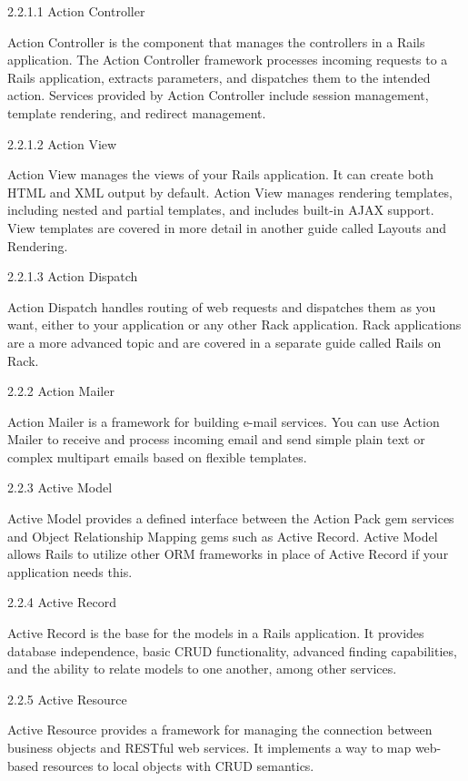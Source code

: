\begin{k}

2.2.1.1 Action Controller

Action Controller is the component that manages the controllers in a Rails
application. The Action Controller framework processes incoming requests to a
Rails application, extracts parameters, and dispatches them to the intended
action. Services provided by Action Controller include session management,
template rendering, and redirect management.

2.2.1.2 Action View

Action View manages the views of your Rails application. It can create both HTML
and XML output by default. Action View manages rendering templates, including
nested and partial templates, and includes built-in AJAX support. View templates
are covered in more detail in another guide called Layouts and Rendering.

2.2.1.3 Action Dispatch

Action Dispatch handles routing of web requests and dispatches them as you want,
either to your application or any other Rack application. Rack applications are
a more advanced topic and are covered in a separate guide called Rails on Rack.

2.2.2 Action Mailer

Action Mailer is a framework for building e-mail services. You can use Action
Mailer to receive and process incoming email and send simple plain text or
complex multipart emails based on flexible templates.

2.2.3 Active Model

Active Model provides a defined interface between the Action Pack gem services
and Object Relationship Mapping gems such as Active Record. Active Model allows
Rails to utilize other ORM frameworks in place of Active Record if your
application needs this.

2.2.4 Active Record

Active Record is the base for the models in a Rails application. It provides
database independence, basic CRUD functionality, advanced finding capabilities,
and the ability to relate models to one another, among other services.

2.2.5 Active Resource

Active Resource provides a framework for managing the connection between
business objects and RESTful web services. It implements a way to map web-based
resources to local objects with CRUD semantics.


\end{k}
